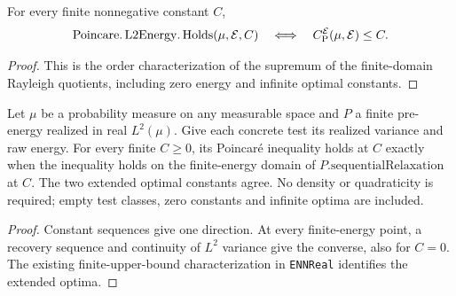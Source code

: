 \begin{theorem}
  \label{thm:l2-energy-holds-order}
  \leanok
  For every finite nonnegative constant $C$,
  \[
    \operatorname{Poincare.L2Energy.Holds}(\mu,\mathcal E,C)
    \quad\Longleftrightarrow\quad
    C_{\mathrm P}^{\mathcal E}(\mu,\mathcal E)\le C.
  \]
\end{theorem}
\begin{proof}
  \leanok
  This is the order characterization of the supremum of the finite-domain Rayleigh quotients,
  including zero energy and infinite optimal constants.
\end{proof}


\begin{lemma}
  \label{lem:preenergy-poincare-relaxation}
  \leanok
  Let $\mu$ be a probability measure on any measurable space and $P$ a finite pre-energy
  realized in real $L^2(\mu)$. Give each concrete test its realized variance and raw energy.
  For every finite $C\ge0$, its Poincar\'e inequality holds at $C$ exactly when the inequality
  holds on the finite-energy domain of $P.\mathrm{sequentialRelaxation}$ at $C$.
  The two extended optimal constants agree. No density or quadraticity is required; empty test
  classes, zero constants and infinite optima are included.
\end{lemma}
\begin{proof}
  \leanok
  Constant sequences give one direction. At every finite-energy point, a recovery sequence
  and continuity of $L^2$ variance give the converse, also for $C=0$. The existing finite-upper-bound
  characterization in \texttt{ENNReal} identifies the extended optima.
\end{proof}
